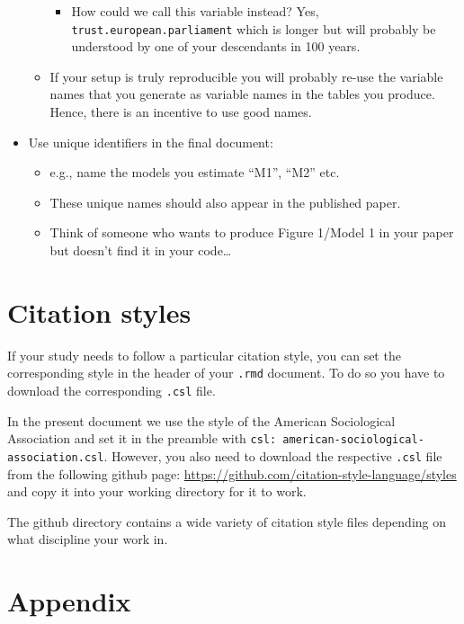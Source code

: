 \documentclass[12pt,]{article}
\providecommand{\tightlist}{%
  \setlength{\itemsep}{0pt}\setlength{\parskip}{0pt}}
\theoremstyle{definition}
\theoremstyle{definition}
\theoremstyle{definition}
\theoremstyle{remark}
\begin{document}
\begin{itemize}
\begin{itemize}
    \begin{itemize}
    \tightlist
    \item
      How could we call this variable instead? Yes,
      \texttt{trust.european.parliament} which is longer but will
      probably be understood by one of your descendants in 100 years.
    \end{itemize}
  \item
    If your setup is truly reproducible you will probably re-use the
    variable names that you generate as variable names in the tables you
    produce. Hence, there is an incentive to use good names.
  \end{itemize}
\item
  Use unique identifiers in the final document:

  \begin{itemize}
  \tightlist
  \item
    e.g., name the models you estimate ``M1'', ``M2'' etc.
  \item
    These unique names should also appear in the published paper.
  \item
    Think of someone who wants to produce Figure 1/Model 1 in your paper
    but doesn't find it in your code\ldots{}
  \end{itemize}
\end{itemize}

\section{Citation styles}\label{citation-styles}

If your study needs to follow a particular citation style, you can set
the corresponding style in the header of your \texttt{.rmd} document. To
do so you have to download the corresponding \texttt{.csl} file.

In the present document we use the style of the American Sociological
Association and set it in the preamble with
\texttt{csl:\ american-sociological-association.csl}. However, you also
need to download the respective \texttt{.csl} file from the following
github page: \url{https://github.com/citation-style-language/styles} and
copy it into your working directory for it to work.

The github directory contains a wide variety of citation style files
depending on what discipline your work in.

\section{Appendix}\label{appendix}
\end{document}
